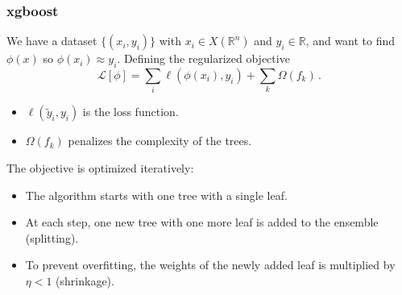 \documentclass[mathserif, 10pt]{beamer}
\begin{document}
\begin{frame}
    \frametitle{xgboost}

    We have a dataset $\{(x_i, y_i)\}$ with $x_i \in X (\mathbb{R}^n)$ and $y_i \in \mathbb{R}$, and want to find $\phi(x)$ so $\phi(x_i)\approx y_i$. Defining the regularized objective
    $$\mathcal{L}[\phi] = \sum_i \ell(\phi(x_i), y_i) + \sum_k \Omega(f_k)\,. $$
\begin{itemize}
    \item $\ell(\tilde{y}_i, y_i)$ is the loss function.
    \item $\Omega(f_k)$ penalizes the complexity of the trees.
\end{itemize}
The objective is optimized iteratively:
\begin{itemize}
    \item The algorithm starts with one tree with a single leaf.
    \item At each step, one new tree with one more leaf is added to the ensemble (splitting).
    \item To prevent overfitting, the weights of the newly added leaf is multiplied by $\eta < 1$ (shrinkage).
\end{itemize}
\end{frame}
\end{document}
